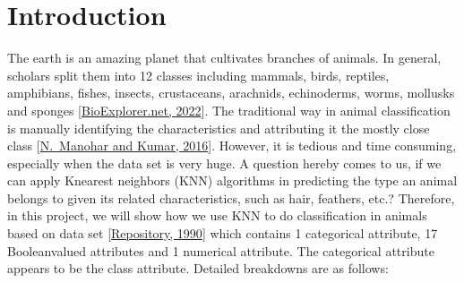 \documentclass[letterpaper,10pt,english]{jupyterBook}
\begin{document}
\chapter{Introduction}
\label{\detokenize{intro:introduction}}\label{\detokenize{intro::doc}}
\sphinxAtStartPar
The earth is an amazing planet that cultivates branches of animals. In general, scholars split them into 12 classes including mammals, birds, reptiles, amphibians, fishes, insects, crustaceans, arachnids, echinoderms, worms, mollusks and sponges {[}\hyperlink{cite.references:id2}{BioExplorer.net, 2022}{]}. The traditional way in animal classification is manually identifying the characteristics and attributing it the mostly close class {[}\hyperlink{cite.references:id3}{N. Manohar and Kumar, 2016}{]}. However, it is tedious and time consuming, especially when the data set is very huge. A question hereby comes to us, if we can apply K\sphinxhyphen{}nearest neighbors (KNN) algorithms in predicting the type an animal belongs to given its related characteristics, such as hair, feathers, etc.? Therefore, in this project, we will show how we use KNN to do classification in animals based on data set {[}\hyperlink{cite.references:id5}{Repository, 1990}{]} which contains 1 categorical attribute, 17 Boolean\sphinxhyphen{}valued attributes and 1 numerical attribute. The categorical attribute appears to be the class attribute. Detailed breakdowns are as follows:
\end{document}
